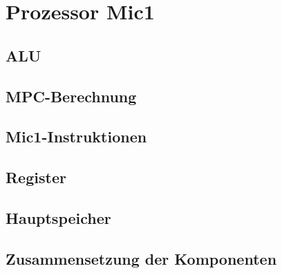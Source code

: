 \chapter{Prozessor Mic1}
\label{prozessor}
\section{ALU}
\section{MPC-Berechnung}
\section{Mic1-Instruktionen}
\section{Register}
\section{Hauptspeicher}
\section{Zusammensetzung der Komponenten}